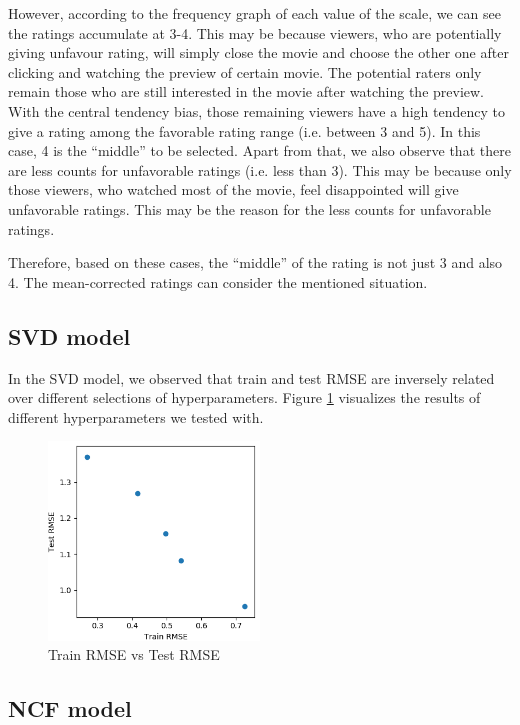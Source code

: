 \documentclass[final]{cvpr}
\begin{document}
However, according to the frequency graph of each value of the scale, we can see the ratings accumulate at 3-4. This may be because viewers, who are potentially giving unfavour rating, will simply close the movie and choose the other one after clicking and watching the preview of certain movie. The potential raters only remain those who are still interested in the movie after watching the preview. With the central tendency bias, those remaining viewers have a high tendency to give a rating among the favorable rating range (i.e. between 3 and 5). In this case, 4 is the “middle” to be selected.  Apart from that, we also observe that there are less counts for unfavorable ratings  (i.e. less than 3). This may be because only those viewers, who watched most of the movie, feel disappointed will give unfavorable ratings. This may be the reason for the less counts for unfavorable ratings.

Therefore, based on these cases, the “middle” of the rating is not just 3 and also 4. The mean-corrected ratings can consider the mentioned situation.

\subsection{\ac{SVD} model}
In the SVD model, we observed that train and test RMSE are inversely related
over different selections of hyperparameters.
Figure \ref{fig:svd-rmse-scatter} visualizes the results of different hyperparameters we tested with.

\begin{figure}
	\includegraphics[width=0.5\textwidth]{screenshot20210422225123.png}
	\caption{Train RMSE vs Test RMSE}
	\label{fig:svd-rmse-scatter}
\end{figure}

\subsection{\ac{NCF} model}

{\small
	
	
}
\end{document}
